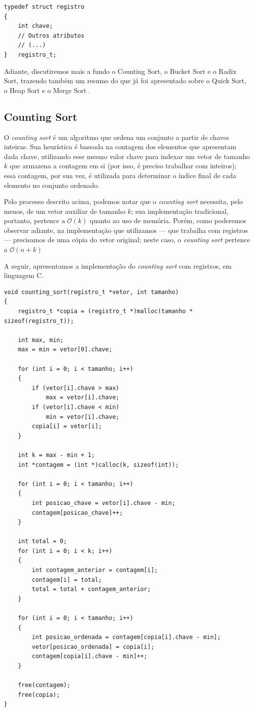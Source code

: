 \documentclass[fontsize=10pt]{article}
\begin{document}
\begin{lstlisting}
typedef struct registro
{
    int chave;
    // Outros atributos
    // (...)
}   registro_t;
\end{lstlisting}

\quad Adiante, discutiremos mais a fundo o Counting Sort, o Bucket Sort e o Radix Sort, trazendo também um resumo do que já foi apresentado sobre o Quick Sort, o Heap Sort e o Merge Sort \cite{relatorio1}\cite{relatorio2}.

\subsection{Counting Sort}

\quad O \textit{counting sort} é um algoritmo que ordena um conjunto a partir de chaves inteiras. Sua heurística é baseada na contagem dos elementos que apresentam dada chave, utilizando esse mesmo valor chave para indexar um vetor de tamanho $k$ que armazena a contagem em si (por isso, é preciso trabalhar com inteiros); essa contagem, por sua vez, é utilizada para determinar o índice final de cada elemento no conjunto ordenado.

\quad Pelo processo descrito acima, podemos notar que o \textit{counting sort} necessita, pelo menos, de um vetor auxiliar de tamanho $k$; sua implementação tradicional, portanto, pertence a $\mathcal{O}(k)$ quanto ao uso de memória. Porém, como poderemos observar adiante, na implementação que utilizamos — que trabalha com registros — precisamos de uma cópia do vetor original; neste caso, o \textit{counting sort} pertence a $\mathcal{O}(n + k)$

\quad A seguir, apresentamos a implementação do \textit{counting sort} com registros, em linguagem C.

\begin{lstlisting}
void counting_sort(registro_t *vetor, int tamanho)
{
    registro_t *copia = (registro_t *)malloc(tamanho * sizeof(registro_t));

    int max, min;
    max = min = vetor[0].chave;
    
    for (int i = 0; i < tamanho; i++)
    {
        if (vetor[i].chave > max)
            max = vetor[i].chave;
        if (vetor[i].chave < min)
            min = vetor[i].chave;
        copia[i] = vetor[i];
    }

    int k = max - min + 1;
    int *contagem = (int *)calloc(k, sizeof(int));

    for (int i = 0; i < tamanho; i++)
    {
        int posicao_chave = vetor[i].chave - min;
        contagem[posicao_chave]++;
    }

    int total = 0;
    for (int i = 0; i < k; i++)
    {
        int contagem_anterior = contagem[i];
        contagem[i] = total;
        total = total + contagem_anterior;
    }

    for (int i = 0; i < tamanho; i++)
    {
        int posicao_ordenada = contagem[copia[i].chave - min];
        vetor[posicao_ordenada] = copia[i];
        contagem[copia[i].chave - min]++;
    }

    free(contagem);
    free(copia);
}
\end{lstlisting}
\end{document}

